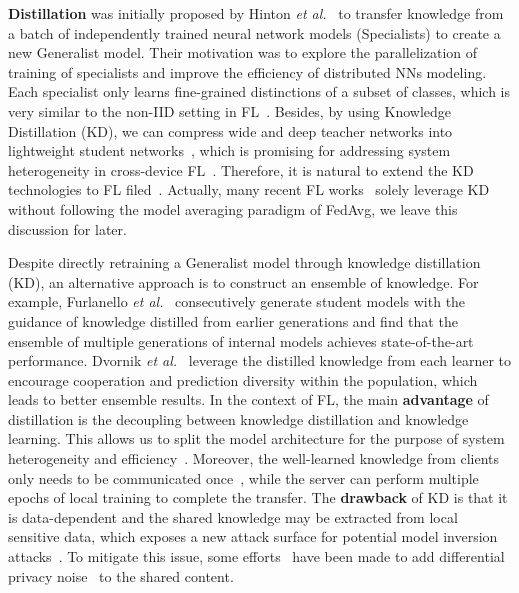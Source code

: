 \textbf{Distillation} was initially proposed by Hinton \textit{et al.}~\cite{hinton2015distilling} to transfer knowledge from a batch of independently trained neural network models (Specialists) to create a new Generalist model.
Their motivation was to explore the parallelization of training of specialists and improve the efficiency of distributed NNs modeling\cite{dean2012large}.
Each specialist only learns fine-grained distinctions of a subset of classes, which is very similar to the non-IID setting in FL~\cite{liqb2022federated}.
Besides, by using Knowledge Distillation (KD), we can compress wide and deep teacher networks into lightweight student networks~\cite{romero2015fitnets}, which is promising for addressing system heterogeneity in cross-device FL~\cite{lim2020federated}.
Therefore, it is natural to extend the KD technologies to FL filed~\cite{jiang2020federated, li2020practical, li2019fedmd, wu2022communication, chen2020fedbe, lin2020ensemble, gong2021ensemble, sun2020federated}.
Actually, many recent FL works~\cite{li2019fedmd, gong2021ensemble, sun2020federated, huang2022learn, fang2022robust, gong2022preserving, luo2022fediris, sui2020feded, chang2021cronus, he2020group, zhang2021parameterized, itahara2021distillation} solely leverage KD without following the model averaging paradigm of FedAvg, we leave this discussion for later. %

Despite directly retraining a Generalist model through knowledge distillation (KD), an alternative approach is to construct an ensemble of knowledge.
For example, Furlanello \textit{et al.}~\cite{furlanello2018born} consecutively generate student models with the guidance of knowledge distilled from earlier generations and find that the ensemble of multiple generations of internal models achieves state-of-the-art performance.
Dvornik \textit{et al.}~\cite{dvornik2019diversity} leverage the distilled knowledge from each learner to encourage cooperation and prediction diversity within the population, which leads to better ensemble results.
In the context of FL, the main \textbf{advantage} of distillation is the decoupling between knowledge distillation and knowledge learning. 
This allows us to split the model architecture for the purpose of system heterogeneity and efficiency~\cite{vepakomma2019split, thapa2022splitfed}.
Moreover, the well-learned knowledge from clients only needs to be communicated once~\cite{gong2021ensemble, gong2022preserving}, while the server can perform multiple epochs of local training to complete the transfer.
The \textbf{drawback} of KD is that it is data-dependent and the shared knowledge may be extracted from local sensitive data, which exposes a new attack surface for potential model inversion attacks~\cite{kim2020multiple, fredrikson2015model}.
To mitigate this issue, some efforts~\cite{wang2022fedkc, fan2022private} have been made to add differential privacy noise~\cite{dwork2006differential} to the shared content.


